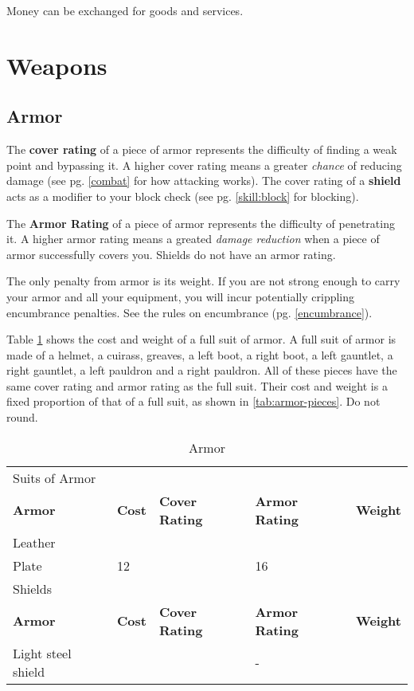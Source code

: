 Money can be exchanged for goods and services.

\section{Weapons}

\begin{multicols}{2}
\section{Armor}
The \textbf{cover rating} of a piece of armor represents the difficulty of
finding a weak point and bypassing it. A higher cover rating means a greater \textit{chance}
of reducing damage (see pg. \ref{combat} for how attacking works). The cover
rating of a \textbf{shield} acts as a modifier to your block check (see pg.
\ref{skill:block} for blocking).

The \textbf{Armor Rating} of a piece of armor represents the difficulty of
penetrating it. A higher armor rating means a greated \textit{damage reduction}
when a piece of armor successfully covers you. Shields do not have an armor
rating.

The only penalty from armor is its weight. If you are not strong enough to
carry your armor and all your equipment, you will incur potentially
crippling encumbrance penalties. See the rules on encumbrance (pg.
\ref{encumbrance}).

Table \ref{tab:armor} shows the cost and weight of a full suit of armor. A full
suit of armor is made of a helmet, a cuirass, greaves, a left boot, a right
boot, a left gauntlet, a right gauntlet, a left pauldron and a right pauldron.
All of these pieces have the same cover rating and armor rating as the full
suit. Their cost and weight is a fixed proportion of that of a full suit, as
shown in \ref{tab:armor-pieces}. Do not round.
\end{multicols}

\begin{table}[h]
    \unclassedrowcolors
    \begin{tabular*}{\textwidth}{l l l l l}
        \multicolumn{5}{l}{Suits of Armor} \\
        \textbf{Armor} & \textbf{Cost} & \textbf{Cover Rating} & \textbf{Armor Rating} & \textbf{Weight} \\
        Leather & & & & \\
        Plate & 12 & & 16 & \\
        \multicolumn{5}{l}{Shields} \\
        \textbf{Armor} & \textbf{Cost} & \textbf{Cover Rating} & \textbf{Armor Rating} & \textbf{Weight} \\
        Light steel shield & & & - & \\
    \end{tabular*}
    \caption{Armor}
    \label{tab:armor}
\end{table}

